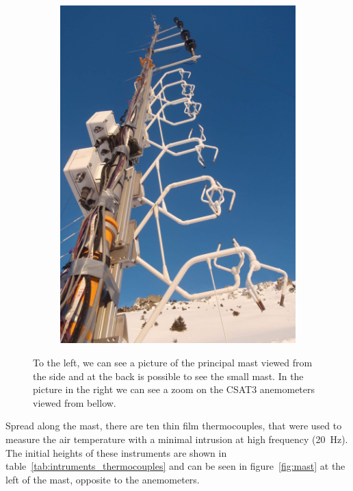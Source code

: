 \begin{figure}[!ht]
\begin{subfigure}[b]{0.4\textwidth}
        \includegraphics[width=\textwidth]{fig/chapter_3/foto_3_small.jpg}
    \end{subfigure}
    \caption{To the left, we can see a picture of the principal mast viewed from the side and at the back is possible to see the small mast. In the picture in the right we can see a zoom on the CSAT3 anemometers viewed from bellow.}
    \label{fig:mast_pics}
\end{figure}

Spread along the mast, there are ten thin film thermocouples, that were used to measure the air temperature with a minimal intrusion at high frequency (20~Hz). The initial heights of these instruments are shown in table~\ref{tab:intruments_thermocouples} and can be seen in figure~\ref{fig:mast} at the left of the mast, opposite to the anemometers.

